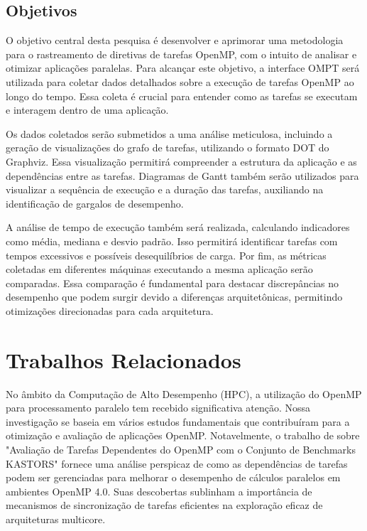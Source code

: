 \documentclass[ppgc,diss]{iiufrgs}
\begin{document}
\subsection{Objetivos}
O objetivo central desta pesquisa é desenvolver e aprimorar uma metodologia para o rastreamento de diretivas de tarefas OpenMP, com o intuito de analisar e otimizar aplicações paralelas. Para alcançar este objetivo, a interface OMPT será utilizada para coletar dados detalhados sobre a execução de tarefas OpenMP ao longo do tempo. Essa coleta é crucial para entender como as tarefas se executam e interagem dentro de uma aplicação.

Os dados coletados serão submetidos a uma análise meticulosa, incluindo a geração de visualizações do grafo de tarefas, utilizando o formato DOT do Graphviz. Essa visualização permitirá compreender a estrutura da aplicação e as dependências entre as tarefas. Diagramas de Gantt também serão utilizados para visualizar a sequência de execução e a duração das tarefas, auxiliando na identificação de gargalos de desempenho.

A análise de tempo de execução também será realizada, calculando indicadores como média, mediana e desvio padrão. Isso permitirá identificar tarefas com tempos excessivos e possíveis desequilíbrios de carga. Por fim, as métricas coletadas em diferentes máquinas executando a mesma aplicação serão comparadas. Essa comparação é fundamental para destacar discrepâncias no desempenho que podem surgir devido a diferenças arquitetônicas, permitindo otimizações direcionadas para cada arquitetura.


\section{Trabalhos Relacionados}
No âmbito da Computação de Alto Desempenho (HPC), a utilização do OpenMP para processamento paralelo tem recebido significativa atenção. Nossa investigação se baseia em vários estudos fundamentais que contribuíram para a otimização e avaliação de aplicações OpenMP. Notavelmente, o trabalho de  sobre "Avaliação de Tarefas Dependentes do OpenMP com o Conjunto de Benchmarks KASTORS" fornece uma análise perspicaz de como as dependências de tarefas podem ser gerenciadas para melhorar o desempenho de cálculos paralelos em ambientes OpenMP 4.0. Suas descobertas sublinham a importância de mecanismos de sincronização de tarefas eficientes na exploração eficaz de arquiteturas multicore.
\end{document}

